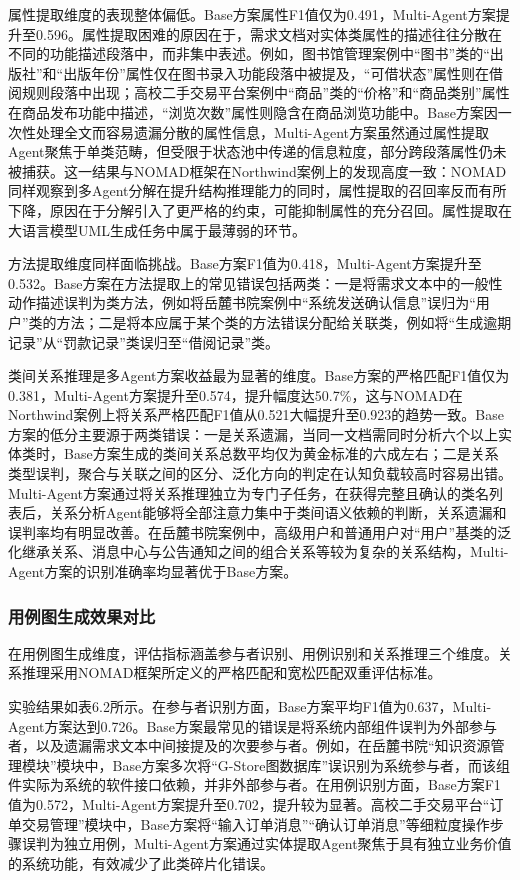 属性提取维度的表现整体偏低。Base方案属性F1值仅为0.491，Multi-Agent方案提升至0.596。属性提取困难的原因在于，需求文档对实体类属性的描述往往分散在不同的功能描述段落中，而非集中表述。例如，图书馆管理案例中“图书”类的“出版社”和“出版年份”属性仅在图书录入功能段落中被提及，“可借状态”属性则在借阅规则段落中出现；高校二手交易平台案例中“商品”类的“价格”和“商品类别”属性在商品发布功能中描述，“浏览次数”属性则隐含在商品浏览功能中。Base方案因一次性处理全文而容易遗漏分散的属性信息，Multi-Agent方案虽然通过属性提取Agent聚焦于单类范畴，但受限于状态池中传递的信息粒度，部分跨段落属性仍未被捕获。这一结果与NOMAD框架在Northwind案例上的发现高度一致：NOMAD同样观察到多Agent分解在提升结构推理能力的同时，属性提取的召回率反而有所下降，原因在于分解引入了更严格的约束，可能抑制属性的充分召回。属性提取在大语言模型UML生成任务中属于最薄弱的环节\cite{giannouris2025nomad}。

方法提取维度同样面临挑战。Base方案F1值为0.418，Multi-Agent方案提升至0.532。Base方案在方法提取上的常见错误包括两类：一是将需求文本中的一般性动作描述误判为类方法，例如将岳麓书院案例中“系统发送确认信息”误归为“用户”类的方法；二是将本应属于某个类的方法错误分配给关联类，例如将“生成逾期记录”从“罚款记录”类误归至“借阅记录”类。

类间关系推理是多Agent方案收益最为显著的维度。Base方案的严格匹配F1值仅为0.381，Multi-Agent方案提升至0.574，提升幅度达50.7\%，这与NOMAD在Northwind案例上将关系严格匹配F1值从0.521大幅提升至0.923的趋势一致。Base方案的低分主要源于两类错误：一是关系遗漏，当同一文档需同时分析六个以上实体类时，Base方案生成的类间关系总数平均仅为黄金标准的六成左右；二是关系类型误判，聚合与关联之间的区分、泛化方向的判定在认知负载较高时容易出错。Multi-Agent方案通过将关系推理独立为专门子任务，在获得完整且确认的类名列表后，关系分析Agent能够将全部注意力集中于类间语义依赖的判断，关系遗漏和误判率均有明显改善。在岳麓书院案例中，高级用户和普通用户对“用户”基类的泛化继承关系、消息中心与公告通知之间的组合关系等较为复杂的关系结构，Multi-Agent方案的识别准确率均显著优于Base方案。

\subsubsection{用例图生成效果对比}

在用例图生成维度，评估指标涵盖参与者识别、用例识别和关系推理三个维度。关系推理采用NOMAD框架所定义的严格匹配和宽松匹配双重评估标准。

实验结果如表6.2所示。在参与者识别方面，Base方案平均F1值为0.637，Multi-Agent方案达到0.726。Base方案最常见的错误是将系统内部组件误判为外部参与者，以及遗漏需求文本中间接提及的次要参与者。例如，在岳麓书院“知识资源管理模块”模块中，Base方案多次将“G-Store图数据库”误识别为系统参与者，而该组件实际为系统的软件接口依赖，并非外部参与者。在用例识别方面，Base方案F1值为0.572，Multi-Agent方案提升至0.702，提升较为显著。高校二手交易平台“订单交易管理”模块中，Base方案将“输入订单消息”“确认订单消息”等细粒度操作步骤误判为独立用例，Multi-Agent方案通过实体提取Agent聚焦于具有独立业务价值的系统功能，有效减少了此类碎片化错误。

